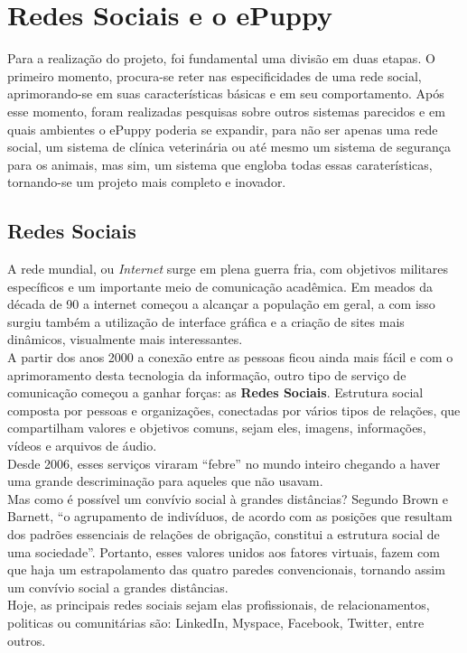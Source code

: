 \chapter{Redes Sociais e o ePuppy}
Para a realização do projeto, foi fundamental uma divisão em duas etapas. O primeiro momento, procura-se reter nas especificidades de uma rede social, aprimorando-se em suas características básicas e em seu comportamento. Após esse momento, foram realizadas pesquisas sobre outros sistemas parecidos e em quais ambientes o ePuppy poderia se expandir, para não ser apenas uma rede social, um sistema de clínica veterinária ou até mesmo um sistema de segurança para os animais, mas sim, um sistema que engloba todas essas caraterísticas, tornando-se um projeto mais completo e inovador.

\section{Redes Sociais}
A rede mundial, ou {\it Internet} surge em plena guerra fria, com objetivos militares específicos e um importante meio de comunicação acadêmica. Em meados da década de 90 a internet começou a alcançar a população em geral, a com isso surgiu também a utilização de interface gráfica e a criação de sites mais dinâmicos, visualmente mais interessantes.
\\
\indent
A partir dos anos 2000 a conexão entre as pessoas ficou ainda mais fácil e com o aprimoramento desta tecnologia da informação, outro tipo de serviço de comunicação começou a ganhar forças: as {\bf Redes Sociais}. Estrutura social composta por pessoas e organizações, conectadas por vários tipos de relações, que compartilham valores e objetivos comuns, sejam eles, imagens, informações, vídeos e arquivos de áudio.
\\
\indent
Desde 2006, esses serviços viraram “febre” no mundo inteiro chegando a haver uma grande descriminação para aqueles que não usavam.
\\
\indent
Mas como é possível um convívio social à grandes distâncias? Segundo Brown e Barnett, “o agrupamento de indivíduos, de acordo com as posições que resultam dos padrões essenciais de relações de obrigação, constitui a estrutura social de uma sociedade”. Portanto, esses valores unidos aos fatores virtuais, fazem com que haja um estrapolamento das quatro paredes convencionais, tornando assim um convívio social a grandes distâncias.
\\
\indent
Hoje, as principais redes sociais sejam elas profissionais, de relacionamentos, politicas ou comunitárias são: LinkedIn, Myspace, Facebook, Twitter, entre outros.

